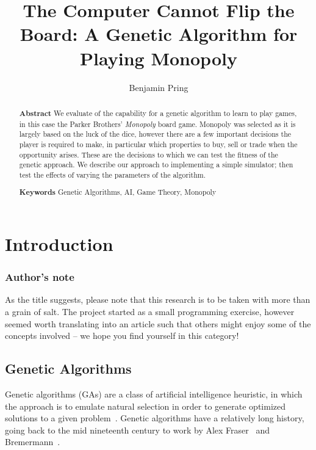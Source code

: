 \documentclass[11pt,a4paper,twocolumn]{scrartcl}
\title{The Computer Cannot Flip the Board: A Genetic Algorithm for Playing Monopoly}
\author{Benjamin Pring}
\begin{document}
\maketitle

\begin{abstract}
\noindent \textbf{Abstract} We evaluate of the capability for a genetic algorithm to learn to play games, in this case the Parker Brothers' \textit{Monopoly} board game. Monopoly was selected as it is largely based on the luck of the dice, however there are a few important decisions the player is required to make, in particular which properties to buy, sell or trade when the opportunity arises. These are the decisions to which we can test the fitness of the genetic approach. We describe our approach to implementing a simple simulator; then test the effects of varying the parameters of the algorithm.

\vspace{2em}

\noindent \textbf{Keywords} Genetic Algorithms, AI, Game Theory, Monopoly
\end{abstract}


\section{Introduction}

\subsubsection*{Author's note}

As the title suggests, please note that this research is to be taken with more than a grain of salt. The project started as a small programming exercise, however seemed worth translating into an article such that others might enjoy some of the concepts involved -- we hope you find yourself in this category!

\subsection{Genetic Algorithms}

Genetic algorithms (GAs) are a class of artificial intelligence heuristic, in which the approach is to emulate natural selection in order to generate optimized solutions to a given problem~\cite{mitchell1998introduction}. Genetic algorithms have a relatively long history, going back to the mid nineteenth century to work by Alex Fraser~\cite{fraser1960simulation} and Bremermann~\cite{bremermann1962optimization}. 
\end{document}
